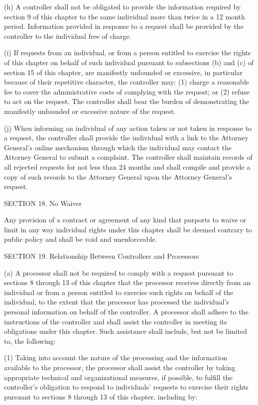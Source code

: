 (h) A controller shall not be obligated to provide the information required by section 9 of this chapter to the same individual more than twice in a 12 month period. Information provided in response to a request shall be provided by the controller to the individual free of charge.

(i) If requests from an individual, or from a person entitled to exercise the rights of this chapter on behalf of such individual pursuant to subsections (b) and (c) of section 15 of this chapter, are manifestly unfounded or excessive, in particular because of their repetitive character, the controller may: (1) charge a reasonable fee to cover the administrative costs of complying with the request; or (2) refuse to act on the request. The controller shall bear the burden of demonstrating the manifestly unfounded or excessive nature of the request.

(j) When informing an individual of any action taken or not taken in response to a request, the controller shall provide the individual with a link to the Attorney General’s online mechanism through which the individual may contact the Attorney General to submit a complaint. The controller shall maintain records of all rejected requests for not less than 24 months and shall compile and provide a copy of such records to the Attorney General upon the Attorney General’s request. 

SECTION 18. No Waiver

Any provision of a contract or agreement of any kind that purports to waive or limit in any way individual rights under this chapter shall be deemed contrary to public policy and shall be void and unenforceable.

SECTION 19. Relationship Between Controllers and Processors 

(a) A processor shall not be required to comply with a request pursuant to sections 8 through 13 of this chapter that the processor receives directly from an individual or from a person entitled to exercise such rights on behalf of the individual, to the extent that the processor has processed the individual’s personal information on behalf of the controller. A processor shall adhere to the instructions of the controller and shall assist the controller in meeting its obligations under this chapter. Such assistance shall include, but not be limited to, the following:

(1) Taking into account the nature of the processing and the information available to the processor, the processor shall assist the controller by taking appropriate technical and organizational measures, if possible, to fulfill the controller’s obligation to respond to individuals’ requests to exercise their rights pursuant to sections 8 through 13 of this chapter, including by:

